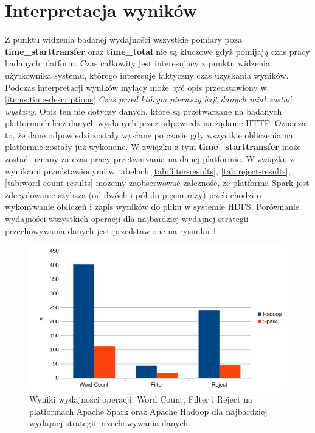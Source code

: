 \section{Interpretacja wyników}
Z punktu widzenia badanej wydajności wszystkie pomiary poza \textbf{time\_starttransfer} oraz \textbf{time\_total} nie są kluczowe gdyż pomijają czas pracy badanych platform. Czas całkowity jest interesujący z punktu widzenia użytkownika systemu, którego interesuje faktyczny czas uzyskania wyników. Podczas interpretacji wyników mylący może być opis przedstawiony w \ref{items:time-descriptions} \textit{Czas przed którym pierwszy bajt danych miał zostać wysłany}. Opis ten nie dotyczy danych, które są przetwarzane na badanych platformach lecz danych wysłanych przez odpowiedź na żądanie HTTP. Oznacza to, że dane odpowiedzi zostały wysłane po czasie gdy wszystkie obliczenia na platformie zostały już wykonane. W związku z tym \textbf{time\_starttransfer} może zostać uznany za czas pracy przetwarzania na danej platformie.
\newline W związku z wynikami przedstawionymi w tabelach \ref{tab:filter-results}, \ref{tab:reject-results}, \ref{tab:word-count-results} możemy zaobserwować zależność, że platforma Spark jest zdecydowanie szybsza (od dwóch i pół do pięciu razy) jeżeli chodzi o wykonywanie obliczeń i zapis wyników do pliku w systemie HDFS. Porównanie wydajności wszystkich operacji dla najbardziej wydajnej strategii przechowywania danych jest przedstawione na rysunku \ref{fig:results-comparison-bar}.
\begin{figure}[!htb]
	\centering
	\includegraphics[scale=0.6]{results-comparison-bar.png}
	\caption{Wyniki wydajności operacji: Word Count, Filter i Reject na platformach Apache Spark oraz Apache Hadoop dla najbardziej wydajnej strategii przechowywania danych.}
	\label{fig:results-comparison-bar}
\end{figure}
